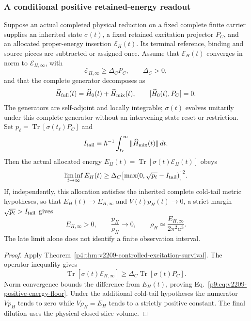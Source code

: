 \documentclass[12pt,a4paper]{article}
\begin{document}
\subsubsection{A conditional positive retained-energy readout}
\begin{corollary}
\label{p9:cor:v2209-survival-cold-readout}
Suppose an actual completed physical reduction on a fixed complete finite
carrier supplies an inherited state \(\sigma(t)\), a fixed retained
excitation projector \(P_C\), and an
allocated proper-energy insertion \(\mathcal E_H(t)\). Its terminal
reference, binding and source pieces are subtracted or assigned once.
Assume that \(\mathcal E_H(t)\) converges in norm to
\(\mathcal E_{H,\infty}\), with
\[
 \mathcal E_{H,\infty}\geq\Delta_C P_C,\qquad \Delta_C>0,
\]
and that the complete generator decomposes as
\[
 \widehat H_{\rm full}(t)=\widehat H_0(t)+\widehat H_{\rm mix}(t),
 \qquad [\widehat H_0(t),P_C]=0.
\]
The generators are self-adjoint and locally integrable; \(\sigma(t)\)
evolves unitarily under this complete generator without an intervening
state reset or restriction.
Set \(p_\ell=\operatorname{Tr}[\sigma(t_\ell)P_C]\) and
\[
 I_{\rm tail}=\hbar^{-1}
       \int_{t_\ell}^{\infty}\|\widehat H_{\rm mix}(t)\|\,dt.
\]
Then the actual allocated energy \(E_H(t)=\operatorname{Tr}
[\sigma(t)\mathcal E_H(t)]\) obeys
\begin{equation}
\label{p9:eq:v2209-positive-energy-floor}
 \liminf_{t\to\infty}E_H(t)\geq
 \Delta_C\bigl[\max(0,\sqrt{p_\ell}-I_{\rm tail})\bigr]^2.
\end{equation}
If, independently, this allocation satisfies the inherited complete
cold-tail metric hypotheses, so that \(E_H(t)\to E_{H,\infty}\) and
\(V(t)p_H(t)\to0\), a strict margin
\(\sqrt{p_\ell}>I_{\rm tail}\) gives
\[
 E_{H,\infty}>0,\qquad \frac{p_H}{\rho_H}\to0,\qquad
 \rho_H\simeq\frac{E_{H,\infty}}{2\pi^2a^3}.
\]
The late limit alone does not identify a finite observation interval.
\end{corollary}
\begin{proof}
Apply Theorem~\ref{p4:thm:v2209-controlled-excitation-survival}.
The operator inequality gives
\[
 \operatorname{Tr}[\sigma(t)\mathcal E_{H,\infty}]
 \geq\Delta_C\operatorname{Tr}[\sigma(t)P_C].
\]
Norm convergence bounds the difference from \(E_H(t)\), proving
Eq.~\eqref{p9:eq:v2209-positive-energy-floor}. Under the additional
cold-tail hypotheses the numerator \(Vp_H\) tends to zero while
\(V\rho_H=E_H\) tends to a strictly positive constant. The final dilution
uses the physical closed-slice volume.
\end{proof}
\end{document}
